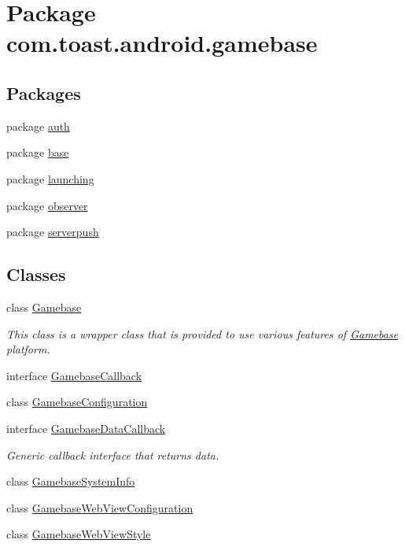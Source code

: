 \hypertarget{namespacecom_1_1toast_1_1android_1_1gamebase}{}\section{Package com.\+toast.\+android.\+gamebase}
\label{namespacecom_1_1toast_1_1android_1_1gamebase}
\subsection*{Packages}
\begin{DoxyCompactItemize}
\item 
package \hyperlink{namespacecom_1_1toast_1_1android_1_1gamebase_1_1auth}{auth}
\item 
package \hyperlink{namespacecom_1_1toast_1_1android_1_1gamebase_1_1base}{base}
\item 
package \hyperlink{namespacecom_1_1toast_1_1android_1_1gamebase_1_1launching}{launching}
\item 
package \hyperlink{namespacecom_1_1toast_1_1android_1_1gamebase_1_1observer}{observer}
\item 
package \hyperlink{namespacecom_1_1toast_1_1android_1_1gamebase_1_1serverpush}{serverpush}
\end{DoxyCompactItemize}
\subsection*{Classes}
\begin{DoxyCompactItemize}
\item 
class \hyperlink{classcom_1_1toast_1_1android_1_1gamebase_1_1_gamebase}{Gamebase}
\begin{DoxyCompactList}\small\item\em This class is a wrapper class that is provided to use various features of \hyperlink{classcom_1_1toast_1_1android_1_1gamebase_1_1_gamebase}{Gamebase} platform. \end{DoxyCompactList}\item 
interface \hyperlink{interfacecom_1_1toast_1_1android_1_1gamebase_1_1_gamebase_callback}{Gamebase\+Callback}
\item 
class \hyperlink{classcom_1_1toast_1_1android_1_1gamebase_1_1_gamebase_configuration}{Gamebase\+Configuration}
\item 
interface \hyperlink{interfacecom_1_1toast_1_1android_1_1gamebase_1_1_gamebase_data_callback}{Gamebase\+Data\+Callback}
\begin{DoxyCompactList}\small\item\em Generic callback interface that returns data. \end{DoxyCompactList}\item 
class \hyperlink{classcom_1_1toast_1_1android_1_1gamebase_1_1_gamebase_system_info}{Gamebase\+System\+Info}
\item 
class \hyperlink{classcom_1_1toast_1_1android_1_1gamebase_1_1_gamebase_web_view_configuration}{Gamebase\+Web\+View\+Configuration}
\item 
class \hyperlink{classcom_1_1toast_1_1android_1_1gamebase_1_1_gamebase_web_view_style}{Gamebase\+Web\+View\+Style}
\end{DoxyCompactItemize}

